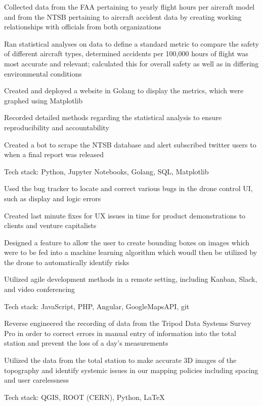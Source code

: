 \documentclass[letterpaper]{resume}
\begin{document}
\begin{compactitem}
\item Collected data from the FAA pertaining to yearly flight hours per aircraft model and from the NTSB pertaining to aircraft accident data by creating working relationships with officials from both organizations
\item Ran statistical analyses on data to define a standard metric to compare the safety of different aircraft types, determined accidents per 100,000 hours of flight was most accurate and relevant; calculated this for overall safety as well as in differing environmental conditions
\item Created and deployed a website in Golang to display the metrics, which were graphed using Matplotlib
\item Recorded detailed methods regarding the statistical analysis to ensure reproducibility and accountability
\item Created a bot to scrape the NTSB database and alert subscribed twitter users to when a final report was released
\item Tech stack: Python, Jupyter Notebooks, Golang, SQL, Matplotlib
\end{compactitem}

\begin{compactitem}
\item Used the bug tracker to locate and correct various bugs in the drone control UI, such as display and logic errors
\item Created last minute fixes for UX issues in time for product demonstrations to clients and venture capitalists
\item Designed a feature to allow the user to create bounding boxes on images which were to be fed into a machine learning algorithm which woudl then be utilized by the drone to automatically identify risks
\item Utilized agile development methods in a remote setting, including Kanban, Slack, and video conferencing
\item Tech stack: JavaScript, PHP, Angular, GoogleMapsAPI, git
\end{compactitem}

\begin{compactitem}
\item Reverse engineered the recording of data from the Tripod Data Systems Survey Pro in order to correct errors in manual entry of information into the total station and prevent the loss of a day's measurements
\item Utilized the data from the total station to make accurate 3D images of the topography and identify systemic issues in our mapping policies including spacing and user carelessness
\item Tech stack: QGIS, ROOT (CERN), Python, LaTeX
\end{compactitem}
\end{document}

